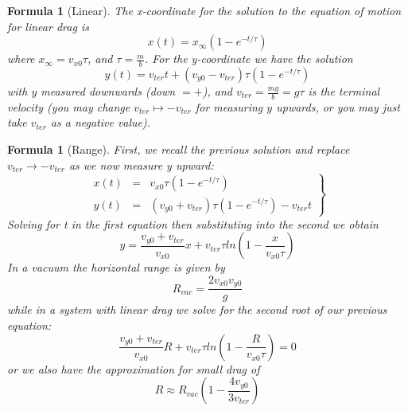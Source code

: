 \documentclass[12pt]{article}
\newtheorem{for}[thm]{Formula}
\theoremstyle{definition}
\theoremstyle{remark}
\numberwithin{equation}{section}
\begin{document}
\begin{for}[Linear]
        The x-coordinate for the solution to the equation of motion for linear drag is \begin{equation}
                x(t) = x_{\infty}\left(1-e^{-t/\tau}\right)
        \end{equation}
        where $x_{\infty} = v_{x0}\tau$, and $\tau = \frac{m}{b}$. For the y-coordinate we have the solution \begin{equation}
                y(t) = v_{ter}t + (v_{y0}-v_{ter})\tau\left(1-e^{-t/\tau}\right)
        \end{equation}
        with $y$ measured downwards (down $= +$), and $v_{ter} = \frac{mg}{b}=g\tau$ is the terminal velocity (you may change $v_{ter}\mapsto -v_{ter}$ for measuring $y$ upwards, or you may just take $v_{ter}$ as a negative value).
\end{for}

\vspace{15pt}


\begin{for}[Range]
        First, we recall the previous solution and replace $v_{ter} \rightarrow -v_{ter}$ as we now measure y upward: \begin{equation}
                \left.\begin{array}{ccc}
                        x(t) & = &v_{x0}\tau\left(1-e^{-t/\tau}\right) \\
                        y(t) & = & (v_{y0} + v_{ter})\tau\left(1-e^{-t/\tau}\right)-v_{ter}t
                \end{array}\right\}
        \end{equation}
        Solving for t in the first equation then substituting into the second we obtain \begin{equation}
                y = \frac{v_{y0}+v_{ter}}{v_{x0}}x+v_{ter}\tau ln\left(1-\frac{x}{v_{x0}\tau}\right)
        \end{equation}
        In a vacuum the horizontal range is given by \begin{equation}
                R_{vac} = \frac{2v_{x0}v_{y0}}{g}
        \end{equation}
        while in a system with linear drag we solve for the second root of our previous equation:\begin{equation}
                \frac{v_{y0}+v_{ter}}{v_{x0}}R+v_{ter}\tau ln\left(1-\frac{R}{v_{x0}\tau}\right) = 0
        \end{equation}
        or we also have the approximation for small drag of \begin{equation}
                R \approx R_{vac}\left(1-\frac{4v_{y0}}{3v_{ter}}\right)
        \end{equation}
\end{for}
\end{document}

